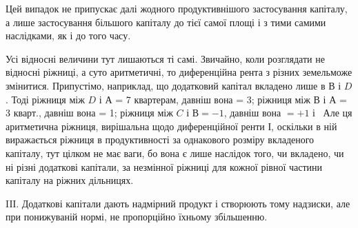 
Цей випадок не припускає далі жодного продуктивнішого застосування
капіталу, а лише застосування більшого капіталу до тієї самої площі і з тими
самими наслідками, як і до того часу.

Усі відносні величини тут лишаються ті самі. Звичайно, коли розглядати
не відносні ріжниці, а суто аритметичні, то диференційна рента з різних земельможе
змінитися. Припустімо, наприклад, що додатковий капітал вкладено лише
в $В$ і $D$. Тоді ріжниця між $D$ і $А$ = 7 квартерам, давніш вона = 3; ріжниця
між $В$ і $А$ = 3 кварт., давніш вона = 1; ріжниця між $C$ і $В = - 1$, давніш
вона $= + 1$ і~ Але ця аритметична ріжниця, вирішальна щодо диференційної
ренти І, оскільки в ній виражається ріжниця в продуктивності за однакового
розміру вкладеного капіталу, тут цілком не має ваги, бо вона є лише
наслідок того, чи вкладено, чи ні різні додаткові капітали, за незмінної ріжниці
для кожної рівної частини капіталу на ріжних дільницях.

IIІ. Додаткові капітали дають надмірний продукт і створюють тому надзиски,
але при понижуваній нормі, не пропорційно їхньому збільшенню.

